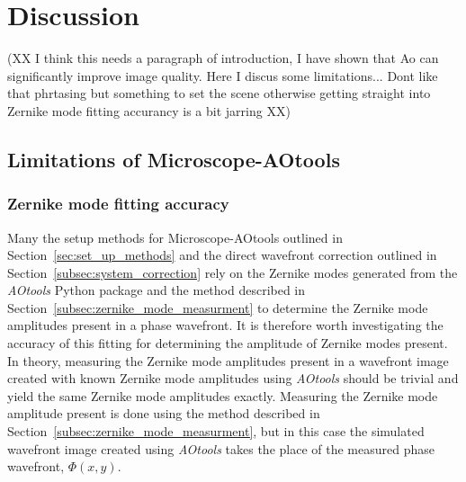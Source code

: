 \chapter{Discussion}

(XX I think this needs a paragraph of introduction, I have shown that
Ao can significantly improve image quality. Here I discus some
limitations... Dont like that phrtasing but something to set the scene
otherwise getting straight into Zernike mode fitting accurancy is a
bit jarring XX)


\section{Limitations of Microscope-AOtools}
\label{sec:limitations}

\subsection{Zernike mode fitting accuracy}
\label{subsec:zernike_accuracy}

Many the setup methods for Microscope-AOtools outlined in 
Section~\ref{sec:set_up_methods} and the direct wavefront correction 
outlined in Section~\ref{subsec:system_correction} rely on the Zernike 
modes generated from the \textit{AOtools} Python package and the method 
described in Section~\ref{subsec:zernike_mode_measurment} to determine the 
Zernike mode amplitudes present in a phase 
wavefront\cite{townson2019aotools}. It is therefore worth investigating the 
accuracy of this fitting for determining the amplitude of Zernike modes 
present. In theory, measuring the Zernike mode amplitudes present in a 
wavefront image created with known Zernike mode amplitudes using 
\textit{AOtools} should be trivial and yield the same Zernike mode amplitudes 
exactly. Measuring the Zernike mode amplitude present is done using the 
method described in Section~\ref{subsec:zernike_mode_measurment}, but in this 
case the simulated wavefront image created using \textit{AOtools} takes the 
place of the measured phase wavefront, $\Phi(x,y)$. 

